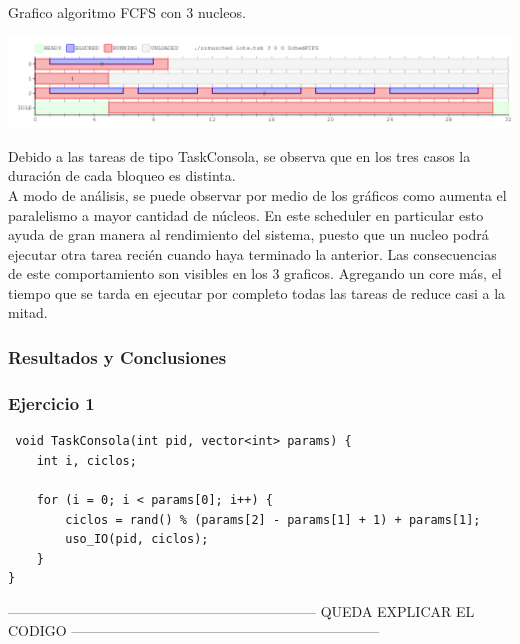   Grafico algoritmo FCFS con 3 nucleos.
\vspace*{0.3cm} \vspace*{0.3cm}
  \begin{center}
 \includegraphics[scale=0.5]{ejercicio2-3nucleo.png}
 \end{center}
  \vspace*{0.3cm}

\indent Debido a las tareas de tipo TaskConsola, se observa que en los tres casos la duración 
de cada bloqueo es distinta.\\
\indent A modo de análisis, se puede observar por medio de los gráficos como aumenta el paralelismo a mayor cantidad de núcleos. 
En este scheduler en particular esto ayuda de gran manera al rendimiento del sistema, puesto que un nucleo podrá ejecutar otra tarea 
recién cuando haya terminado la anterior. Las consecuencias de este comportamiento son visibles en los 3 graficos. Agregando un core más, 
el tiempo que se tarda en ejecutar por completo todas las tareas de reduce casi a la mitad.\\


\subsubsection{Resultados y Conclusiones}

\subsubsection[]{Ejercicio 1}

\begin{verbatim}
 void TaskConsola(int pid, vector<int> params) {
	int i, ciclos;

	for (i = 0; i < params[0]; i++) {
		ciclos = rand() % (params[2] - params[1] + 1) + params[1];
		uso_IO(pid, ciclos);
	}
} 
\end{verbatim}
------------------------------------------------------------------
QUEDA EXPLICAR EL CODIGO
------------------------------------------------------------------

